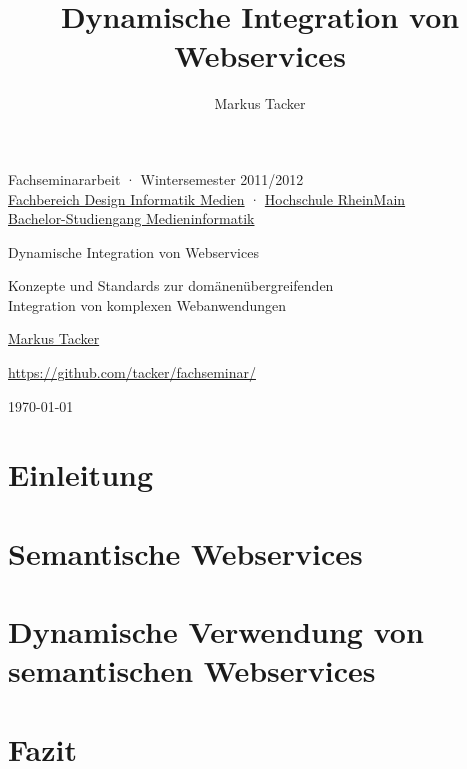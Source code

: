 \documentclass[10pt,a4paper]{article}
\begin{document}
\author{Markus Tacker}
\title{Dynamische Integration von Webservices}

\begin{center}

\begin{small}Fachseminararbeit · Wintersemester 2011/2012\\\href{http://www.hs-rm.de/dcsm}{Fachbereich Design Informatik Medien} · \href{http://www.hs-rm.de/}{Hochschule RheinMain}\\\href{http://www.hs-rm.de/medieninformatik}{Bachelor-Studiengang Medieninformatik}\end{small}

\bigskip

\begin{huge}Dynamische Integration von Webservices\end{huge}

\begin{small}Konzepte und Standards zur domänenübergreifenden\\Integration von komplexen Webanwendungen\end{small}

\bigskip

\begin{large}\href{http://markusstudiert.de/}{Markus Tacker}\end{large}

\begin{small}\url{https://github.com/tacker/fachseminar/}\end{small}

\today

\end{center}



\section{Einleitung}
\label{l:einleitung}


\section{Semantische Webservices}
\label{l:sem-web-ser}


\section{Dynamische Verwendung von semantischen Webservices}
\label{l:loesungen}


\section{Fazit}
\label{l:fazit}



\end{document}

